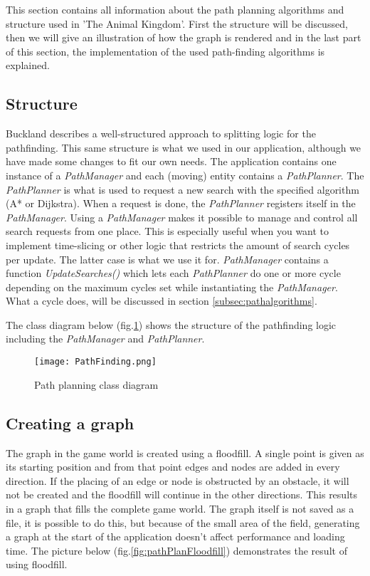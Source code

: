 This section contains all information about the path planning algorithms and structure used in 'The Animal Kingdom'.
First the structure will be discussed, then we will give an illustration of how the graph is rendered and in the last part of this section,
the implementation of the used path-finding algorithms is explained.

\subsection{Structure}\label{subsec:pathstructure}
Buckland\cite{pgaie} describes a well-structured approach to splitting logic for the pathfinding.
This same structure is what we used in our application, although we have made some changes to fit our own needs.
The application contains one instance of a \textit{PathManager} and each (moving) entity contains a \textit{PathPlanner}.
The \textit{PathPlanner} is what is used to request a new search with the specified algorithm (A* or Dijkstra).
When a request is done, the \textit{PathPlanner} registers itself in the \textit{PathManager}.
Using a \textit{PathManager} makes it possible to manage and control all search requests from one place.
This is especially useful when you want to implement time-slicing or other logic that restricts the amount of search cycles per update.
The latter case is what we use it for.
\textit{PathManager} contains a function \textit{UpdateSearches()} which lets each \textit{PathPlanner} do one or more cycle depending on the maximum cycles set while instantiating the \textit{PathManager}.
What a cycle does, will be discussed in section \ref{subsec:pathalgorithms}.\par
The class diagram below (fig.\ref{fig:pathPlanClassDiagram}) shows the structure of the pathfinding logic including the \textit{PathManager} and \textit{PathPlanner}.

\begin{figure}[h!]
    \begin{center}
        \texttt{[image: PathFinding.png]}
    \end{center}
    \caption{Path planning class diagram}
    \label{fig:pathPlanClassDiagram}
\end{figure}

\subsection{Creating a graph}\label{subsec:pathgraphcreation}
The graph in the game world is created using a floodfill.
A single point is given as its starting position and from that point edges and nodes are added in every direction.
If the placing of an edge or node is obstructed by an obstacle, it will not be created and the floodfill will continue
in the other directions.
This results in a graph that fills the complete game world.
The graph itself is not saved as a file, it is possible to do this, but because of the small area of the field,
generating a graph at the start of the application doesn't affect performance and loading time.
The picture below (fig.\ref{fig:pathPlanFloodfill}) demonstrates the result of using floodfill.

